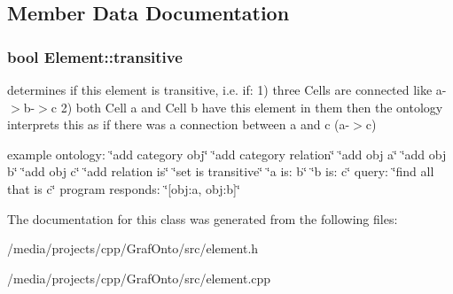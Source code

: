 \subsection{\-Member \-Data \-Documentation}
\hypertarget{class_element_aab52339b96c0a9ed05da28a26b5fb146}{
\subsubsection[{transitive}]{\setlength{\rightskip}{0pt plus 5cm}bool {\bf \-Element\-::transitive}}}\label{class_element_aab52339b96c0a9ed05da28a26b5fb146}


determines if this element is transitive, i.\-e. if\-: 1) three \-Cells are connected like a-\/$>$b-\/$>$c 2) both \-Cell a and \-Cell b have this element in them then the ontology interprets this as if there was a connection between a and c (a-\/$>$c) 

example ontology\-: \char`\"{}add category obj\char`\"{} \char`\"{}add category relation\char`\"{} \char`\"{}add obj a\char`\"{} \char`\"{}add obj b\char`\"{} \char`\"{}add obj c\char`\"{} \char`\"{}add relation is\char`\"{} \char`\"{}set is transitive\char`\"{} \char`\"{}a is\-: b\char`\"{} \char`\"{}b is\-: c\char`\"{} query\-: \char`\"{}find all that is c\char`\"{} program responds\-: \char`\"{}\mbox{[}obj\-:a, obj\-:b\mbox{]}\char`\"{} 

\-The documentation for this class was generated from the following files\-:\begin{DoxyCompactItemize}
\item 
/media/projects/cpp/\-Graf\-Onto/src/element.\-h\item 
/media/projects/cpp/\-Graf\-Onto/src/element.\-cpp\end{DoxyCompactItemize}
